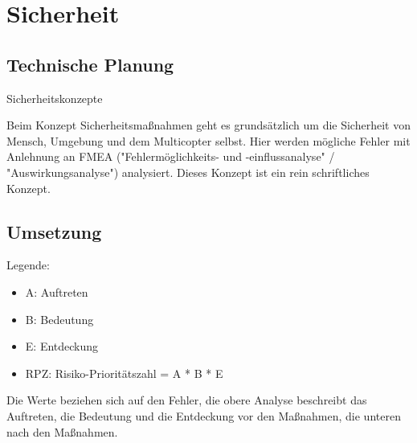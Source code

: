 
\section{Sicherheit}

  \subsection{Technische Planung}

Sicherheitskonzepte

Beim Konzept Sicherheitsmaßnahmen geht es grundsätzlich um die Sicherheit von Mensch, Umgebung und dem Multicopter selbst. Hier werden mögliche Fehler mit Anlehnung an FMEA ("Fehlermöglichkeits- und -einflussanalyse" / "Auswirkungsanalyse") analysiert. Dieses Konzept ist ein rein schriftliches Konzept.

  \subsection{Umsetzung}

    Legende:
    \begin{itemize}
    \item A: Auftreten
    \item B: Bedeutung
    \item E: Entdeckung
    \item RPZ: Risiko-Prioritätszahl = A * B * E
    \end{itemize}

    Die Werte beziehen sich auf den Fehler, die obere Analyse beschreibt das Auftreten, die Bedeutung und die Entdeckung vor den Maßnahmen, die unteren nach den Maßnahmen.

